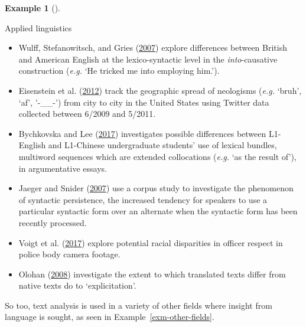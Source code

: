 \documentclass[
  letterpaper,
  DIV=11,
  numbers=noendperiod]{scrreport}
\providecommand{\tightlist}{%
  \setlength{\itemsep}{0pt}\setlength{\parskip}{0pt}}\usepackage{longtable,booktabs,array}
\theoremstyle{definition}
\newtheorem{example}{Example}[chapter]
\theoremstyle{remark}
\begin{document}
\begin{example}[]\protect\hypertarget{exm-linguistic-applied}{}\label{exm-linguistic-applied}

Applied linguistics

\begin{itemize}
\tightlist
\item
  Wulff, Stefanowitsch, and Gries
  (\protect\hyperlink{ref-Wulff2007}{2007}) explore differences between
  British and American English at the lexico-syntactic level in the
  \emph{into}-causative construction (\emph{e.g.} `He tricked me into
  employing him.').
\item
  Eisenstein et al. (\protect\hyperlink{ref-Eisenstein2012}{2012}) track
  the geographic spread of neologisms (\emph{e.g.} `bruh', `af',
  '-\_\_-') from city to city in the United States using Twitter data
  collected between 6/2009 and 5/2011.
\item
  Bychkovska and Lee (\protect\hyperlink{ref-Bychkovska2017}{2017})
  investigates possible differences between L1-English and L1-Chinese
  undergraduate students' use of lexical bundles, multiword sequences
  which are extended collocations (\emph{e.g.} `as the result of'), in
  argumentative essays.
\item
  Jaeger and Snider (\protect\hyperlink{ref-Jaeger2007}{2007}) use a
  corpus study to investigate the phenomenon of syntactic persistence,
  the increased tendency for speakers to use a particular syntactic form
  over an alternate when the syntactic form has been recently processed.
\item
  Voigt et al. (\protect\hyperlink{ref-Voigt2017}{2017}) explore
  potential racial disparities in officer respect in police body camera
  footage.
\item
  Olohan (\protect\hyperlink{ref-Olohan2008}{2008}) investigate the
  extent to which translated texts differ from native texts do to
  `explicitation'.
\end{itemize}

\end{example}

So too, text analysis is used in a variety of other fields where insight
from language is sought, as seen in Example~\ref{exm-other-fields}.
\end{document}
